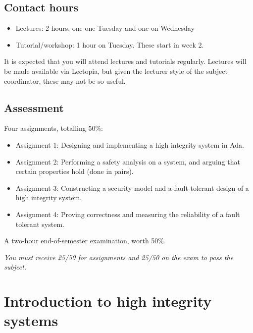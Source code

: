 \subsection*{Contact hours}

\begin{itemize}

 \item Lectures: 2 hours, one one Tuesday and one on Wednesday

 \item Tutorial/workshop: 1 hour on Tuesday. These start in week 2.

\end{itemize}

It is expected that you will attend lectures and tutorials regularly. Lectures
will be made available via Lectopia, but given the lecturer style of the
subject coordinator, these may not be so useful.


\subsection*{Assessment}

Four assignments, totalling 50\%:

\begin{itemize}

 \item Assignment 1: Designing and implementing a high integrity system in Ada.

 \item Assignment 2: Performing a safety analysis on a system, and arguing that certain properties hold (done in pairs).

 \item Assignment 3: Constructing a security model and a fault-tolerant design of a high integrity system.

 \item Assignment 4: Proving correctness and measuring the reliability of a fault tolerant system.

\end{itemize}

A two-hour end-of-semester examination, worth 50\%.

\emph{You must receive 25/50 for assignments and 25/50 on the exam to pass the subject.}

\section{Introduction to high integrity systems}

